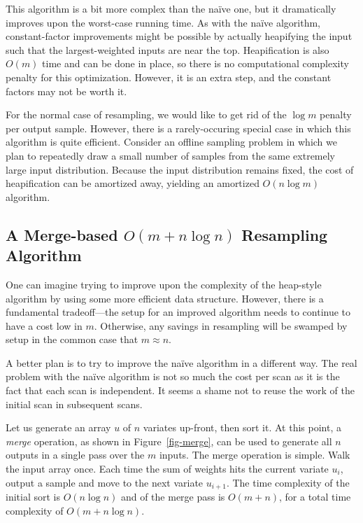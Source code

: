 \documentclass[12pt]{article}
\begin{document}
  This algorithm is a bit more complex than the na\"ive one,
  but it dramatically improves upon the worst-case running
  time.  As with the na\"ive algorithm, constant-factor
  improvements might be possible by actually heapifying the input
  such that the largest-weighted inputs are near the top.
  Heapification is also $O(m)$ time and can be done in
  place, so there is no computational complexity penalty for
  this optimization.  However, it is an extra step, and the
  constant factors may not be worth it.

  For the normal case of resampling, we would like to get
  rid of the $\log m$ penalty per output sample.  However,
  there is a rarely-occuring special case in which this
  algorithm is quite efficient.  Consider an offline
  sampling problem in which we plan to repeatedly draw a
  small number of samples from the same extremely large
  input distribution.  Because the input distribution
  remains fixed, the cost of heapification can be amortized
  away, yielding an amortized $O(n \log m)$ algorithm.

\subsection{A Merge-based $O(m + n \log n)$ Resampling Algorithm}\label{sec-merge}

  One can imagine trying to improve upon the complexity of
  the heap-style algorithm by using some more efficient data
  structure.  However, there is a fundamental tradeoff---the
  setup for an improved algorithm needs to continue to have
  a cost low in $m$.  Otherwise, any savings in resampling
  will be swamped by setup in the common case that $m
  \approx n$.

  A better plan is to try to improve the na\"ive algorithm
  in a different way.  The real problem with the na\"ive
  algorithm is not so much the cost per scan as it is the
  fact that each scan is independent.  It seems a shame not
  to reuse the work of the initial scan in subsequent scans.

  Let us generate an array $u$ of $n$ variates up-front,
  then sort it.  At this point, a {\em merge} operation, as
  shown in Figure~\ref{fig-merge}, can be used to generate
  all $n$ outputs in a single pass over the $m$ inputs.  The
  merge operation is simple.  Walk the input array once.
  Each time the sum of weights hits the current variate
  $u_i$, output a sample and move to the next variate
  $u_{i+1}$.  The time complexity of the initial sort is
  $O(n \log n)$ and of the merge pass is $O(m + n)$, for a
  total time complexity of $O(m + n \log n)$.
\end{document}

